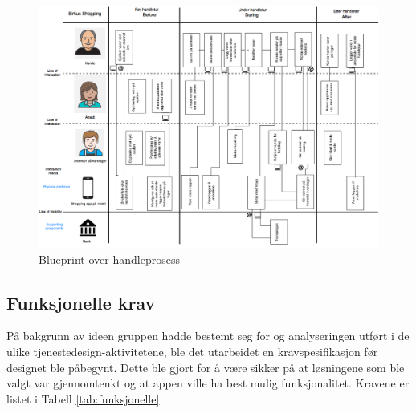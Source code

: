 \begin{figure}[H]
\includegraphics[scale=0.37]{images/customerjourneyBlueprint/blueprint5png}
\caption{Blueprint over handleprosess}
\label{fig:blueprint}
\end{figure}

\subsection{Funksjonelle krav}
På bakgrunn av ideen gruppen hadde bestemt seg for og analyseringen utført i de ulike tjenestedesign-aktivitetene, ble det utarbeidet en kravspesifikasjon før designet ble påbegynt. Dette ble gjort for å være sikker på at løsningene som ble valgt var gjennomtenkt og at appen ville ha best mulig funksjonalitet. Kravene er listet i Tabell \ref{tab:funksjonelle}.

